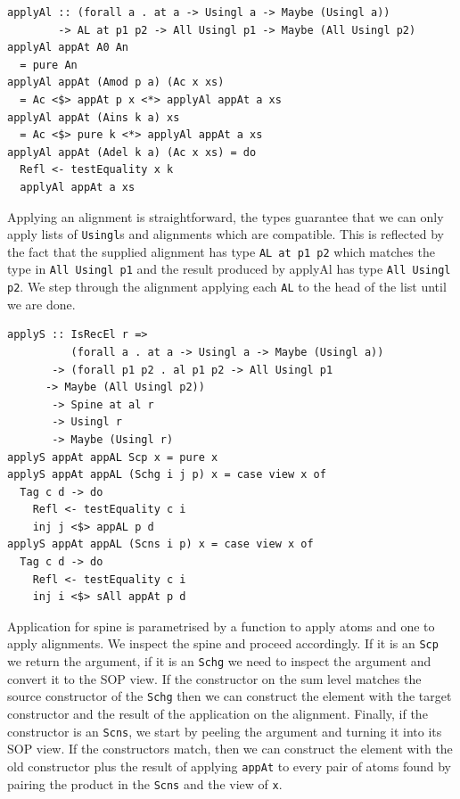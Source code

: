 \documentclass[11pt, titlepage]{article}
\newcommand{\toHaskell}[1]{\texttt{#1}\xspace}
\newcommand{\scp}{\toHaskell{Scp}}
\newcommand{\scns}{\toHaskell{Scns}}
\newcommand{\schg}{\toHaskell{Schg}}
\begin{document}
\begin{verbatim}
applyAl :: (forall a . at a -> Usingl a -> Maybe (Usingl a))
        -> AL at p1 p2 -> All Usingl p1 -> Maybe (All Usingl p2)
applyAl appAt A0 An
  = pure An
applyAl appAt (Amod p a) (Ac x xs)
  = Ac <$> appAt p x <*> applyAl appAt a xs
applyAl appAt (Ains k a) xs
  = Ac <$> pure k <*> applyAl appAt a xs
applyAl appAt (Adel k a) (Ac x xs) = do
  Refl <- testEquality x k
  applyAl appAt a xs
\end{verbatim}

Applying an alignment is straightforward, the types guarantee that we can only 
apply lists of \texttt{Usingl}s and alignments which are compatible. This is 
reflected by the fact that the supplied alignment has type \texttt{AL at p1 p2} 
which matches the type in \texttt{All Usingl p1} and the result produced by 
applyAl has type \texttt{All Usingl p2}. We step through the alignment applying 
each \texttt{AL} to the head of the list until we are done.

\begin{verbatim}
applyS :: IsRecEl r =>
          (forall a . at a -> Usingl a -> Maybe (Usingl a))
       -> (forall p1 p2 . al p1 p2 -> All Usingl p1 
	  -> Maybe (All Usingl p2))
       -> Spine at al r
       -> Usingl r
       -> Maybe (Usingl r)
applyS appAt appAL Scp x = pure x
applyS appAt appAL (Schg i j p) x = case view x of
  Tag c d -> do
    Refl <- testEquality c i
    inj j <$> appAL p d
applyS appAt appAL (Scns i p) x = case view x of
  Tag c d -> do
    Refl <- testEquality c i
    inj i <$> sAll appAt p d
\end{verbatim}

Application for spine is parametrised by a function to apply atoms and one to 
apply alignments. We inspect the spine and proceed accordingly. If it is an \scp 
we return the argument, if it is an \schg we need to inspect the argument and 
convert it to the SOP view. If the constructor on the sum level matches the 
source constructor of the \schg then we can construct the element with the 
target constructor and the result of the application on the alignment.
Finally, if the constructor is an \scns, we start by peeling the argument and 
turning it into its SOP view. If the constructors match, then we can construct 
the element with the old constructor plus the result of applying \texttt{appAt} 
to every pair of atoms found by pairing the product in the \scns and the view of 
\texttt{x}.
\end{document}
